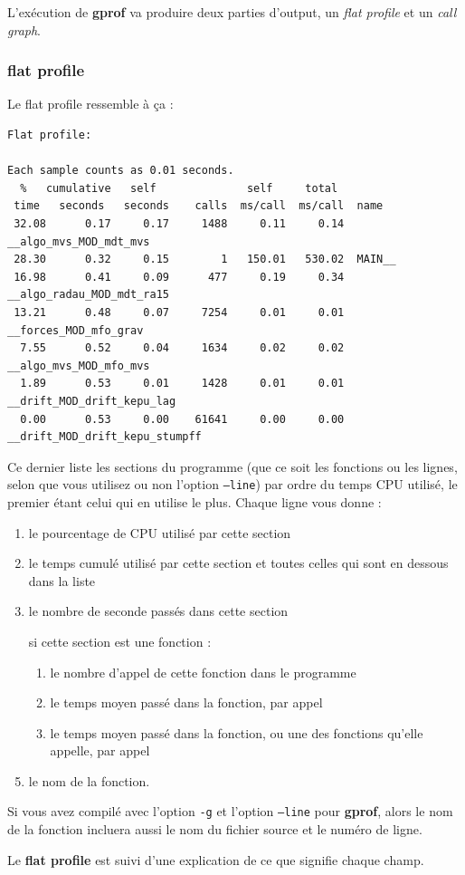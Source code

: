 \documentclass[a4paper,twoside]{article}
\begin{document}
L'exécution de \textbf{gprof} va produire deux parties d'output, un \textit{flat profile} et un \textit{call graph}.
\subsubsection{flat profile}
Le flat profile ressemble à ça : 
\begin{verbatim}
Flat profile:

Each sample counts as 0.01 seconds.
  %   cumulative   self              self     total           
 time   seconds   seconds    calls  ms/call  ms/call  name    
 32.08      0.17     0.17     1488     0.11     0.14  __algo_mvs_MOD_mdt_mvs
 28.30      0.32     0.15        1   150.01   530.02  MAIN__
 16.98      0.41     0.09      477     0.19     0.34  __algo_radau_MOD_mdt_ra15
 13.21      0.48     0.07     7254     0.01     0.01  __forces_MOD_mfo_grav
  7.55      0.52     0.04     1634     0.02     0.02  __algo_mvs_MOD_mfo_mvs
  1.89      0.53     0.01     1428     0.01     0.01  __drift_MOD_drift_kepu_lag
  0.00      0.53     0.00    61641     0.00     0.00  __drift_MOD_drift_kepu_stumpff
\end{verbatim}

Ce dernier liste les sections du programme (que ce soit les fonctions ou les lignes, selon que vous utilisez ou non l'option \texttt{--line}) par ordre du temps CPU utilisé, le premier étant celui qui en utilise le plus. Chaque ligne vous donne : 
\begin{enumerate}
\item le pourcentage de CPU utilisé par cette section
\item le temps cumulé utilisé par cette section et toutes celles qui sont en dessous dans la liste
\item le nombre de seconde passés dans cette section
\item [si cette section est une fonction] : 
\begin{enumerate}
\item le nombre d'appel de cette fonction dans le programme
\item le temps moyen passé dans la fonction, par appel
\item le temps moyen passé dans la fonction, ou une des fonctions qu'elle appelle, par appel
\end{enumerate}
\item le nom de la fonction.
\end{enumerate}

\begin{remarque}
Si vous avez compilé avec l'option \texttt{-g} et l'option \texttt{--line} pour \textbf{gprof}, alors le nom de la fonction incluera aussi le nom du fichier source et le numéro de ligne. 

Le \textbf{flat profile} est suivi d'une explication de ce que signifie chaque champ.
\end{remarque}
\end{document}
